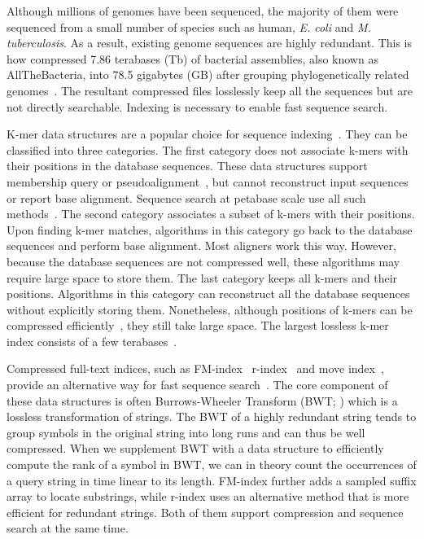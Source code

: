 \documentclass[webpdf,contemporary,large,namedate]{oup-authoring-template}%
\begin{document}
Although millions of genomes have been sequenced,
the majority of them were sequenced from a small number of species such as human, \emph{E. coli} and \emph{M. tuberculosis}.
As a result, existing genome sequences are highly redundant.
This is how \citet{Hunt2024.03.08.584059} compressed 7.86 terabases (Tb) of bacterial assemblies, also known as AllTheBacteria, into 78.5 gigabytes (GB)
after grouping phylogenetically related genomes~\citep{Brinda:2024aa}.
The resultant compressed files losslessly keep all the sequences but are not directly searchable.
Indexing is necessary to enable fast sequence search.

K-mer data structures are a popular choice for sequence indexing~\citep{Marchet:2021aa}.
They can be classified into three categories.
The first category does not associate k-mers with their positions in the database sequences.
These data structures support membership query or pseudoalignment~\citep{Bray:2016aa},
but cannot reconstruct input sequences or report base alignment.
Sequence search at petabase scale use all such methods~\citep{Edgar:2022aa,Karasikov2020.10.01.322164,Shiryev:2024aa}.
The second category associates a subset of k-mers with their positions.
Upon finding k-mer matches, algorithms in this category go back to the database sequences and perform base alignment.
Most aligners work this way.
However, because the database sequences are not compressed well,
these algorithms may require large space to store them.
The last category keeps all k-mers and their positions.
Algorithms in this category can reconstruct all the database sequences without explicitly storing them.
Nonetheless, although positions of k-mers can be compressed efficiently~\citep{Karasikov:2020aa},
they still take large space.
The largest lossless k-mer index consists of a few terabases~\citep{Karasikov2020.10.01.322164}.

Compressed full-text indices, such as FM-index~\citep{DBLP:conf/focs/FerraginaM00} r-index~\citep{DBLP:conf/soda/GagieNP18,DBLP:journals/tcs/BannaiGI20,DBLP:journals/jacm/GagieNP20}
and move index~\citep{DBLP:conf/icalp/NishimotoT21},
provide an alternative way for fast sequence search~\citep{DBLP:journals/csur/Navarro21}.
The core component of these data structures is often Burrows-Wheeler Transform (BWT; \citealt*{Burrows:1994aa})
which is a lossless transformation of strings.
The BWT of a highly redundant string tends to group symbols in the original string into long runs
and can thus be well compressed.
When we supplement BWT with a data structure to efficiently compute the rank of a symbol in BWT,
we can in theory count the occurrences of a query string in time linear to its length.
FM-index further adds a sampled suffix array to locate substrings,
while r-index uses an alternative method that is more efficient for redundant strings.
Both of them support compression and sequence search at the same time.
\end{document}
